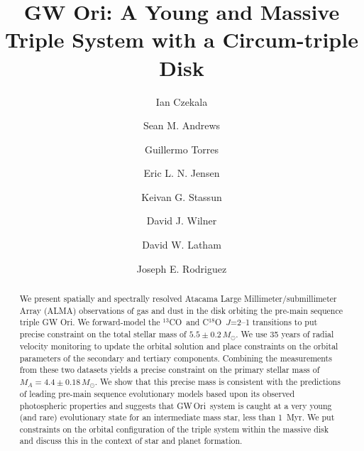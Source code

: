 \documentclass[twocolumn]{aastex61}
\newcommand{\gw}{GW\,Ori}
\newcommand{\thirteen}{${}^{13}$CO}
\newcommand{\eighteen}{C${}^{18}$O}
\begin{document}
\title{GW Ori: A Young and Massive Triple System with a Circum-triple Disk}


\author[0000-0002-1483-8811]{Ian Czekala}

\author[0000-0003-2253-2270]{Sean M. Andrews}

\author[0000-0002-5286-0251]{Guillermo Torres}

\author[0000-0002-4625-7333]{Eric L. N. Jensen}

\author[0000-0002-3481-9052]{Keivan G. Stassun}

\author[0000-0003-1526-7587]{David J. Wilner}

\author[0000-0001-9911-7388]{David W. Latham}

\author[0000-0001-8812-0565]{Joseph E. Rodriguez}


\begin{abstract}
We present spatially and spectrally resolved Atacama Large Millimeter/submillimeter Array (ALMA) observations of gas and dust in the disk orbiting the pre-main sequence triple GW Ori. We forward-model the \thirteen\ and \eighteen\ $J$=2--1 transitions to put precise constraint on the total stellar mass of $5.5 \pm 0.2\,M_\odot$. We use 35 years of radial velocity monitoring to update the orbital solution and place constraints on the orbital parameters of the secondary and tertiary components. Combining the measurements from these two datasets yields a precise constraint on the primary stellar mass of $M_A = 4.4\pm 0.18\,M_\odot$. We show that this precise mass is consistent with the predictions of leading pre-main sequence evolutionary models based upon its observed photospheric properties and suggests that \gw\ system is caught at a very young (and rare) evolutionary state for an intermediate mass star, less than 1~Myr. We put constraints on the orbital configuration of the triple system within the massive disk and discuss this in the context of star and planet formation.
\end{abstract}
\end{document}
